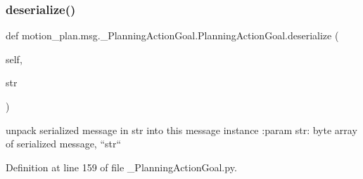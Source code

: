 \subsubsection{\texorpdfstring{deserialize()}{deserialize()}}
{\footnotesize\ttfamily def motion\+\_\+plan.\+msg.\+\_\+\+Planning\+Action\+Goal.\+Planning\+Action\+Goal.\+deserialize (\begin{DoxyParamCaption}\item[{}]{self,  }\item[{}]{str }\end{DoxyParamCaption})}

\begin{DoxyVerb}unpack serialized message in str into this message instance
:param str: byte array of serialized message, ``str``
\end{DoxyVerb}
 

Definition at line 159 of file \+\_\+\+Planning\+Action\+Goal.\+py.


